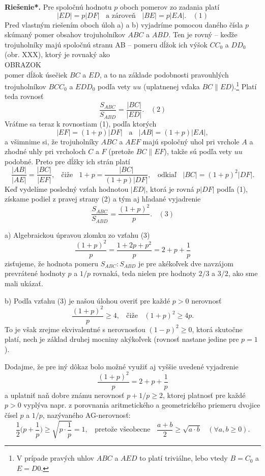 \documentclass[11pt,a4paper,oneside,final]{book}
\newcommand{\rieh}{\textbf{Riešenie*.} }
\begin{document}
\rieh Pre spoločnú hodnotu $p$ oboch pomerov zo zadania platí
$$|ED| = p|DF| \ \ \ \ \text{a zároveň} \ \ \ \ |BE| = p|EA|.  \ \ \ \ (1)$$
Pred vlastným riešením oboch úloh a) a b) vyjadríme pomocou daného čísla $p$ skúmaný pomer obsahov trojuholníkov $ABC$ a $ABD$. Ten je rovný -- keďže trojuholníky majú spoločnú stranu AB -- pomeru dĺžok ich výšok $CC_0$ a $DD_0$ (obr. XXX), ktorý je rovnaký ako
\\
OBRAZOK
\\
pomer dĺžok úsečiek $BC$ a $ED$, a to na základe podobnosti pravouhlých trojuholníkov $BCC_0$ a $EDD_0$ podľa vety $uu$ (uplatnenej vďaka $BC \parallel ED$).\footnote{V prípade pravých uhlov $ABC$ a $AED$ to platí triviálne, lebo vtedy $B = C_0$ a $E = D0$.} Platí teda rovnosť
$$\frac{S_{ABC}}{S_{ABD}} =\frac{|BC|}{|ED|}.\ \ \ \  (2)$$
Vráťme sa teraz k rovnostiam (1), podľa ktorých
$$|EF| = (1 + p)|DF| \ \ \ \ \text{a} \ \ \ \ |AB| = (1 + p)|EA|,$$
a všimnime si, že trojuholníky $ABC$ a $AEF$ majú spoločný uhol pri vrchole $A$ a zhodné uhly pri vrcholoch $C$ a $F$ (pretože $BC \parallel EF$), takže sú podľa vety $uu$ podobné. Preto
pre dĺžky ich strán platí
$$\frac{|AB|}{|AE|}=\frac{|BC|}{|EF|},\ \ \ \ \text{čiže} \ \ \ \  1 + p =\frac{|BC|}{(1 + p)|DF|}, \ \ \ \ \text{odkiaľ} \ \ \ \ |BC| = (1 + p)^2 |DF|.$$
Keď vydelíme posledný vzťah hodnotou $|ED|$, ktorá je rovná $p|DF|$ podľa (1), získame podiel z pravej strany (2) a tým aj hľadané vyjadrenie
$$\frac{S_{ABC}}{S_{ABD}}=\frac{(1 + p)^2}{p}. \ \ \ \  (3)$$

a) Algebraickou úpravou zlomku zo vzťahu (3)
$$ \frac{(1 + p)^2}{p}=\frac{1 + 2p + p^2}{p}= 2 + p + \frac{1}{p}$$
zisťujeme, že hodnota pomeru $S_{ABC} : S_{ABD}$ je pre akékoľvek dve navzájom prevrátené hodnoty $p$ a $1/p$ rovnaká, teda nielen pre hodnoty $2/3$ a $3/2$, ako sme mali ukázať.

b) Podľa vzťahu (3) je našou úlohou overiť pre každé $p > 0$ nerovnosť
$$\frac{(1 + p)^2}{p}\geq4,\ \ \ \ \text{čiže} \ \ \ \  (1 + p)^2\geq 4p.$$
To je však zrejme ekvivalentné s nerovnosťou $(1 -p)^2\geq 0$, ktorá skutočne platí, nech je základ druhej mocniny akýkoľvek (rovnosť nastane jedine pre $p = 1$).

Dodajme, že pre iný dôkaz bolo možné využiť aj vyššie uvedené  vyjadrenie
$$\frac{(1 + p)^2}{p}= 2 + p +\frac{1}{p}$$
a uplatniť naň dobre známu nerovnosť $p + 1/p \geq 2$, ktorej platnosť pre každé $p > 0$ vyplýva napr. z porovnania aritmetického a geometrického priemeru dvojice čísel $p$ a $1/p$, nazývaného AG-nerovnosť:
$$\frac{1}{2}\bigg(p +\frac{1}{p}\bigg)\geq \sqrt{p\cdot \frac{1}{p}}= 1, \ \ \ \ \text{pretože všeobecne} \ \ \ \ \frac{a+b}{2} \geq \sqrt{a\cdot b} \ \ \ \ (\forall a, b \geq 0).$$
\end{document}
